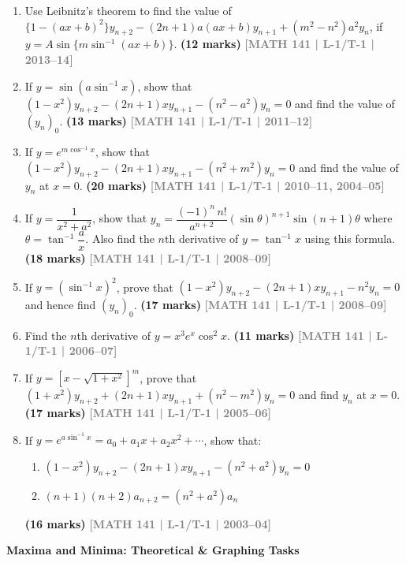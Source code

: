 \documentclass[12pt,a3paper]{article}
\newcommand{\yr}[1]{\hfill\textcolor{gray}{\small\textbf{[#1]}}}
\newcommand{\mk}[1]{\textcolor{orange!70!black}{\small\textbf{(#1 marks)}}}
\newcommand{\subtopic}[2]{%
  \vspace{10pt}
  \noindent\begin{tcolorbox}[colback=#1!8,colframe=#1,boxrule=0.6pt,arc=4pt,
    left=6pt,right=6pt,top=4pt,bottom=4pt]
    \small\bfseries\textcolor{#1}{#2}
  \end{tcolorbox}
  \vspace{2pt}
}
\begin{document}
\begin{enumerate}
\item Use Leibnitz's theorem to find the value of $\{1-(ax+b)^{2}\}y_{n+2}-(2n+1)a(ax+b)y_{n+1}+(m^{2}-n^{2})a^{2}y_{n}$, if $y=A\sin\{m\sin^{-1}(ax+b)\}$.
\mk{12} \yr{MATH 141 | L-1/T-1 | 2013--14}

\item If $y=\sin(a\sin^{-1}x)$, show that $(1-x^{2})y_{n+2}-(2n+1)xy_{n+1}-(n^{2}-a^{2})y_{n}=0$ and find the value of $(y_{n})_{0}$.
\mk{13} \yr{MATH 141 | L-1/T-1 | 2011--12}

\item If $y=e^{m\cos^{-1}x}$, show that $(1-x^{2})y_{n+2}-(2n+1)xy_{n+1}-(n^{2}+m^{2})y_{n}=0$ and find the value of $y_{n}$ at $x=0$.
\mk{20} \yr{MATH 141 | L-1/T-1 | 2010--11, 2004--05}

\item If $y=\dfrac{1}{x^{2}+a^{2}}$, show that $y_{n}=\dfrac{(-1)^{n}\,n!}{a^{n+2}}(\sin\theta)^{n+1}\sin(n+1)\theta$ where $\theta=\tan^{-1}\!\dfrac{a}{x}$. Also find the $n$th derivative of $y=\tan^{-1}x$ using this formula.
\mk{18} \yr{MATH 141 | L-1/T-1 | 2008--09}

\item If $y=(\sin^{-1}x)^{2}$, prove that $(1-x^{2})y_{n+2}-(2n+1)xy_{n+1}-n^{2}y_{n}=0$ and hence find $(y_{n})_{0}$.
\mk{17} \yr{MATH 141 | L-1/T-1 | 2008--09}

\item Find the $n$th derivative of $y=x^{3}e^{x}\cos^{2}x$.
\mk{11} \yr{MATH 141 | L-1/T-1 | 2006--07}

\item If $y=[x-\sqrt{1+x^{2}}]^{m}$, prove that $(1+x^{2})y_{n+2}+(2n+1)xy_{n+1}+(n^{2}-m^{2})y_{n}=0$ and find $y_{n}$ at $x=0$.
\mk{17} \yr{MATH 141 | L-1/T-1 | 2005--06}

\item If $y=e^{a\sin^{-1}x}=a_{0}+a_{1}x+a_{2}x^{2}+\cdots$, show that:
\begin{enumerate}
  \item $(1-x^{2})y_{n+2}-(2n+1)xy_{n+1}-(n^{2}+a^{2})y_{n}=0$
  \item $(n+1)(n+2)a_{n+2}=(n^{2}+a^{2})a_{n}$
\end{enumerate}
\mk{16} \yr{MATH 141 | L-1/T-1 | 2003--04}

\end{enumerate}

\subtopic{cA}{Maxima and Minima: Theoretical \& Graphing Tasks}
\label{sub:s1-maxmin-theory}
\end{document}
